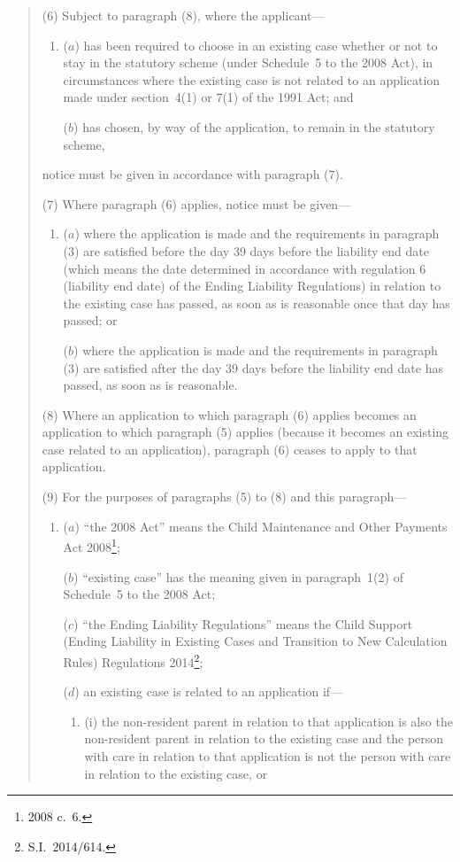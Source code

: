 \documentclass[12pt,a4paper]{article}
\begin{document}
\begin{enumerate}
\begin{quotation}
(6) Subject to paragraph (8), where the applicant—
\begin{enumerate}\item[]
($a$) has been required to choose in an existing case whether or not to stay in the statutory scheme (under Schedule~5 to the 2008 Act), in circumstances where the existing case is not related to an application made under section~4(1) or 7(1) of the 1991 Act; and

($b$) has chosen, by way of the application, to remain in the statutory scheme,
\end{enumerate}
notice must be given in accordance with paragraph (7).

(7) Where paragraph (6) applies, notice must be given—
\begin{enumerate}\item[]
($a$) where the application is made and the requirements in paragraph (3) are satisfied before the day 39 days before the liability end date (which means the date determined in accordance with regulation 6 (liability end date) of the Ending Liability Regulations) in relation to the existing case has passed, as soon as is reasonable once that day has passed; or

($b$) where the application is made and the requirements in paragraph (3) are satisfied after the day 39 days before the liability end date has passed, as soon as is reasonable.
\end{enumerate}

(8) Where an application to which paragraph (6) applies becomes an application to which paragraph (5) applies (because it becomes an existing case related to an application), paragraph (6) ceases to apply to that application.

(9) For the purposes of paragraphs (5) to (8) and this paragraph—
\begin{enumerate}\item[]
($a$) “the 2008 Act” means the Child Maintenance and Other Payments Act 2008\footnote{2008 c.~6.};

\begin{sloppypar}
($b$) “existing case” has the meaning given in paragraph~1(2) of Schedule~5 to the 2008 Act;
\end{sloppypar}

($c$) “the Ending Liability Regulations” means the Child Support (Ending Liability in Existing Cases and Transition to New Calculation Rules) Regulations 2014\footnote{S.I.~2014/614.};

($d$) an existing case is related to an application if—
\begin{enumerate}\item[]
(i) the non-resident parent in relation to that application is also the non-resident parent in relation to the existing case and the person with care in relation to that application is not the person with care in relation to the existing case, or


\end{enumerate}
\end{enumerate}
\end{quotation}
\end{enumerate}
\end{document}
